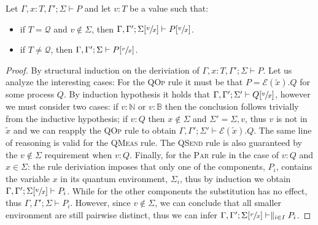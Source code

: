 \begin{theorem}
  Let $\Gamma, x : T, \Gamma'; \Sigma \vdash P$ and let $v : T$ be a value such that:
  \begin{itemize}
    \item if $T = \mathcal{Q}$ and $v \not\in \Sigma$, then $\Gamma, \Gamma'; \Sigma[\sfrac{v}{x}] \vdash P[\sfrac{v}{x}]$.
    \item if $T \neq \mathcal{Q}$, then $\Gamma, \Gamma'; \Sigma \vdash P[\sfrac{v}{x}]$.
  \end{itemize}
\end{theorem}
\begin{proof}
  By structural induction on the deriviation of $\Gamma, x : T, \Gamma'; \Sigma \vdash P$.
  Let us analyze the interesting cases: For the \textsc{QOp} rule it must be that $P = \mathcal{E}(\widetilde{x}).Q$ for some process $Q$.
  By induction hypothesis it holds that $\Gamma, \Gamma'; \Sigma' \vdash Q[\sfrac{v}{x}]$, however we must consider two cases:
  if $v : \mathbb{N}$ or $v : \mathbb{B}$ then the conclusion follows trivially from the inductive hypothesis;
  if $v : Q$ then $x \not\in \Sigma$ and $\Sigma' = \Sigma, v$, thus $v$ is not in $\widetilde{x}$ and we can reapply the \textsc{QOp} rule to obtain
  $\Gamma, \Gamma'; \Sigma' \vdash \mathcal{E}(\widetilde{x}).Q$. The same line of reasoning is valid for the \textsc{QMeas} rule.
  The \textsc{QSend} rule is also guaranteed by the $v \not\in \Sigma$ requirement when $v : Q$.
  Finally, for the \textsc{Par} rule in the case of $v : Q$ and $x \in \Sigma$: the rule deriviation imposes that only one of the components, $P_i$,
  contains the variable $x$ in its quantum environment, $\Sigma_i$, thus by induction we obtain $\Gamma, \Gamma'; \Sigma[\sfrac{v}{x}] \vdash P_i$.
  While for the other components the substitution has no effect, thus $\Gamma, \Gamma'; \Sigma \vdash P_i$. However, since $v \not\in \Sigma$, we can
  conclude that all smaller environment are still pairwise distinct, thus we can infer $\Gamma, \Gamma'; \Sigma[\sfrac{v}{x}] \vdash \parallel_{i \in I} P_i$.
\end{proof}

